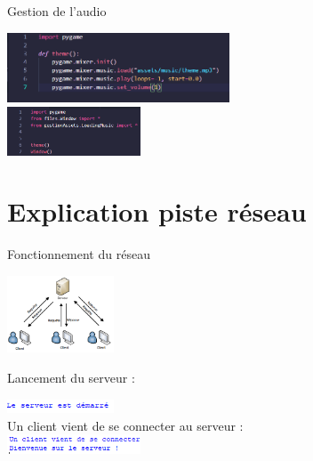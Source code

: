 \documentclass{beamer}
\begin{document}
	
	
	\begin{frame}{Gestion de l'audio}
		\begin{center}
	
	
			\includegraphics[width=250px]{images/audio.png}
			\\
			\includegraphics[width=150px]{images/main.png}

		\end{center}
	\end{frame}
	
\section{Explication piste réseau}

	
	\begin{frame}{Fonctionnement du réseau}

		\centering

		\includegraphics[width=120px]{images/schema.png}


		Lancement du serveur : \newline

		\includegraphics[width=120px]{images/serveur.png}
		\\
		Un client vient de se connecter au serveur : \newline
		\\
		\includegraphics[width=150px]{images/client_conecter.png}

	\end{frame}
	
	
	
\end{document}
